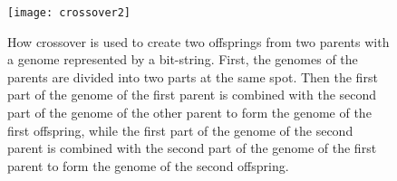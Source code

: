 \begin{figure}[htbp]
    \centering
    \texttt{[image: crossover2]}
    \caption[How crossover is used to create two offsprings from two parents with a genome represented by a bit-string.]{How crossover is used to create two offsprings from two parents with a genome represented by a bit-string. First, the genomes of the parents are divided into two parts at the same spot. Then the first part of the genome of the first parent is combined with the second part of the genome of the other parent to form the genome of the first offspring, while the first part of the genome of the second parent is combined with the second part of the genome of the first parent to form the genome of the second offspring.}
    \label{fig:Crossover}
\end{figure}
 

